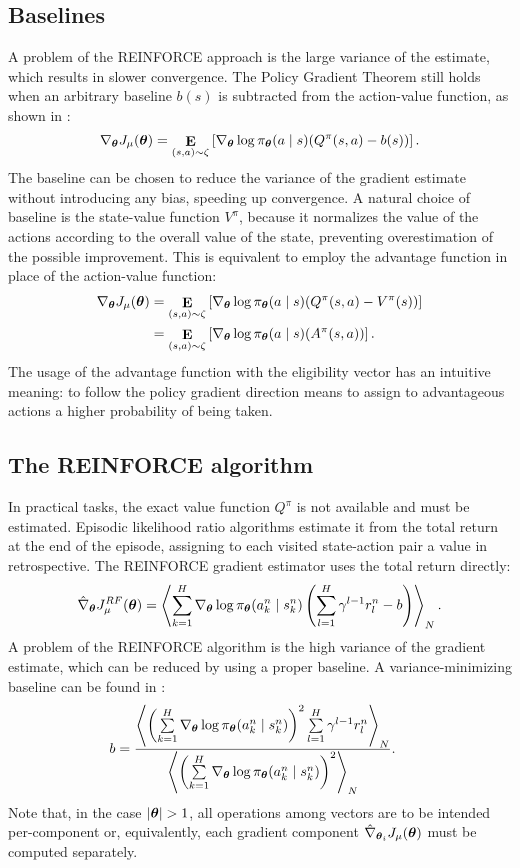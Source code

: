 \subsection{Baselines}
A problem of the REINFORCE approach is the large variance of the estimate, which results in slower convergence.
The Policy Gradient Theorem still holds when an arbitrary baseline $b(s)$ is subtracted from the action-value function, as shown in \cite{Williams1992}:
\[
	\nabla_{\boldsymbol{\theta}}J_\mu(\boldsymbol{\theta}) = \mathop{\mathbf{E}}_{(s,a)\sim\zeta}
		\left[\nabla_{\boldsymbol{\theta}}\log\pi_{\boldsymbol{\theta}}(a \mid s) (Q^{\pi}(s,a) - b(s))\right].
\]
The baseline can be chosen to reduce the variance of the gradient estimate without introducing any bias, speeding up convergence. A natural choice of baseline is the state-value function $V^{\pi}$, because it normalizes the value of the actions according to the overall value of the state, preventing overestimation of the possible improvement. This is equivalent to employ the advantage function in place of the action-value function:
\begin{align*}
	\nabla_{\boldsymbol{\theta}}J_\mu(\boldsymbol{\theta}) &= \mathop{\mathbf{E}}_{(s,a)\sim\zeta}
		\left[\nabla_{\boldsymbol{\theta}}\log\pi_{\boldsymbol{\theta}}(a \mid s) (Q^{\pi}(s,a) - V^{\pi}(s))\right] \\
		&= \mathop{\mathbf{E}}_{(s,a)\sim\zeta}
				\left[\nabla_{\boldsymbol{\theta}}\log\pi_{\boldsymbol{\theta}}(a \mid s) (A^{\pi}(s,a))\right].
\end{align*}
The usage of the advantage function with the eligibility vector has an intuitive meaning: to follow the policy gradient direction means to assign to advantageous actions a higher probability of being taken. 

\subsection{The REINFORCE algorithm}
In practical tasks, the exact value function $Q^{\pi}$ is not available and must be estimated. Episodic likelihood ratio algorithms estimate it from the total return at the end of the episode, assigning to each visited state-action pair a value in retrospective. The REINFORCE gradient estimator \cite{Williams1992} uses the total return directly:
\[
	\hat{\nabla}_{\boldsymbol{\theta}}J_{\mu}^{RF}(\boldsymbol{\theta}) = 
		\left\langle
		\sum\limits_{k=1}^H\nabla_{\boldsymbol{\theta}}\log\pi_{\boldsymbol{\theta}}(a_k^n \mid s_k^n)
		\left(\sum\limits_{l=1}^H\gamma^{l-1}r_l^n-b\right)\right\rangle_N.
\]
A problem of the REINFORCE algorithm is the high variance of the gradient estimate, which can be reduced by using a proper baseline. A variance-minimizing baseline can be found in \cite{Peters2008reinf}:
\begin{align*}
	b &= \frac{\left\langle\left(\sum\limits_{k=1}^H\nabla_{\boldsymbol{\theta}}\log\pi_{\boldsymbol{\theta}}(a_k^n \mid s_k^n)\right)^2
		\sum\limits_{l=1}^H\gamma^{l-1}r_l^n\right\rangle_N}
		{\left\langle\left(\sum\limits_{k=1}^H\nabla_{\boldsymbol{\theta}}\log\pi_{\boldsymbol{\theta}}(a_k^n \mid s_k^n)\right)^2
		\right\rangle_N}.
\end{align*}
Note that, in the case $|\vtheta|>1$, all operations among vectors are to be intended per-component or, equivalently, each gradient component $\hat{\nabla}_{\boldsymbol{\theta}_i}J_{\mu}(\boldsymbol{\theta})$ must be computed separately.

